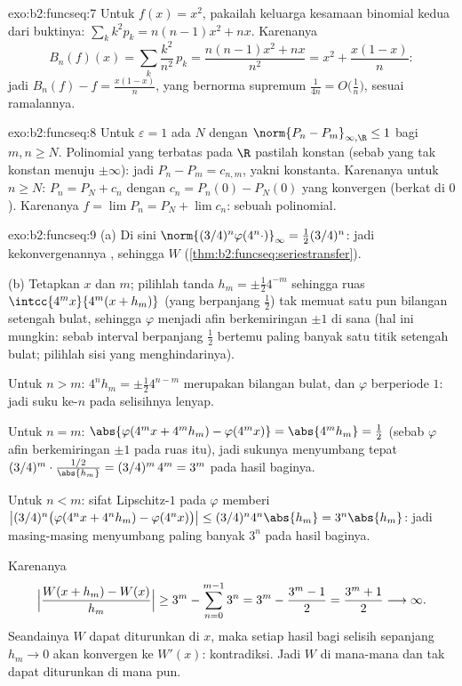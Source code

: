\begin{solution}{exo:b2:funcseq:7}
Untuk $f(x) = x^2$, pakailah keluarga kesamaan binomial kedua dari
buktinya: $\sum_k k^2 p_k = n(n-1)x^2 + nx$. Karenanya
\[
B_n(f)(x) = \sum_k \frac{k^2}{n^2}\,p_k
= \frac{n(n-1)x^2 + nx}{n^2}
= x^2 + \frac{x(1 - x)}{n} :
\]
jadi $B_n(f) - f = \frac{x(1-x)}{n}$, yang bernorma supremum
$\frac{1}{4n} = O\bigl(\frac1n\bigr)$, sesuai ramalannya.
\end{solution}

\begin{solution}{exo:b2:funcseq:8}
Untuk $\varepsilon = 1$ ada $N$ dengan $\norm{P_n - P_m}_{\infty,
\R} \leq 1$ bagi $m, n \geq N$. Polinomial yang terbatas pada $\R$
pastilah konstan (sebab yang tak konstan menuju $\pm\infty$): jadi $P_n
- P_m = c_{n,m}$, yakni konstanta. Karenanya untuk $n \geq N$: $P_n =
P_N + c_n$ dengan $c_n = P_n(0) - P_N(0)$ yang konvergen (berkat
 di $0$). Karenanya $f = \lim P_n = P_N +
\lim c_n$: sebuah polinomial.
\end{solution}

\begin{solution}{exo:b2:funcseq:9}
(a) Di sini $\norm{(3/4)^n\varphi(4^n\cdot)}_\infty = \frac12
(3/4)^n$: jadi kekonvergenannya , sehingga $W$ 
(\cref{thm:b2:funcseq:seriestransfer}).

(b) Tetapkan $x$ dan $m$; pilihlah tanda $h_m = \pm\frac12 4^{-m}$
sehingga ruas $\intcc{4^mx}{4^m(x + h_m)}$ (yang berpanjang $\frac12$)
tak memuat satu pun bilangan setengah bulat, sehingga $\varphi$ menjadi
afin berkemiringan $\pm1$ di sana (hal ini mungkin: sebab interval
berpanjang $\frac12$ bertemu paling banyak satu titik setengah bulat;
pilihlah sisi yang menghindarinya).

Untuk $n > m$: $4^n h_m = \pm\frac12 4^{n-m}$ merupakan bilangan bulat,
dan $\varphi$ berperiode $1$: jadi suku ke-$n$ pada selisihnya lenyap.

Untuk $n = m$: $\abs{\varphi(4^m x + 4^m h_m) - \varphi(4^m x)} =
\abs{4^m h_m} = \frac12$ (sebab $\varphi$ afin berkemiringan $\pm 1$ pada
ruas itu), jadi sukunya menyumbang tepat $(3/4)^m \cdot
\frac{1/2}{\abs{h_m}} = (3/4)^m\,4^m = 3^m$ pada hasil baginya.

Untuk $n < m$: sifat Lipschitz-$1$ pada $\varphi$ memberi
$\bigl|(3/4)^n\bigl(\varphi(4^nx + 4^nh_m) -
\varphi(4^nx)\bigr)\bigr| \leq (3/4)^n 4^n\abs{h_m} =
3^n\abs{h_m}$: jadi masing-masing menyumbang paling banyak $3^n$ pada
hasil baginya.

Karenanya
\[
\Bigl|\frac{W(x + h_m) - W(x)}{h_m}\Bigr|
\geq 3^m - \sum_{n=0}^{m-1} 3^n
= 3^m - \frac{3^m - 1}{2} = \frac{3^m + 1}{2}
\longrightarrow \infty .
\]
Seandainya $W$ dapat diturunkan di $x$, maka setiap hasil bagi selisih
sepanjang $h_m \to 0$ akan konvergen ke $W'(x)$: kontradiksi. Jadi $W$
 di mana-mana dan tak dapat diturunkan di mana pun.
\end{solution}


